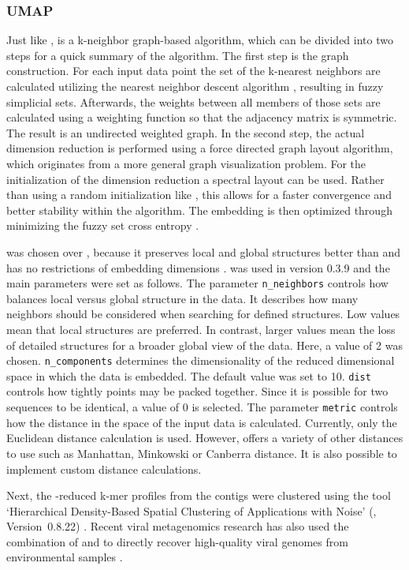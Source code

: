 \documentclass[12pt,a4paper,english]{article}
\begin{document}
	\subsubsection*{UMAP}
	Just like \tsne, \umap is a k-neighbor graph-based algorithm, which can be divided into two steps for a quick summary of the algorithm. The first step is the graph construction.
	For each input data point the set of the k-nearest neighbors are calculated utilizing the nearest neighbor descent algorithm \citep{k-near:11}, resulting in fuzzy simplicial sets.
	Afterwards, the weights between all members of those sets are calculated using a weighting function so that the adjacency matrix is symmetric. The result is an undirected weighted graph.
	In the second step, the actual dimension reduction is performed using a force directed graph layout algorithm, which originates from a more general graph visualization problem. For the initialization of the dimension reduction a spectral layout can be used. Rather than using a random initialization like \tsne, this allows for a faster convergence and better stability within the algorithm.
	The embedding is then optimized through minimizing the fuzzy set cross entropy \citep{umap:18}.
		  
	\umap was chosen over \tsne, because it preserves local and global structures better than \tsne and has no restrictions of embedding dimensions \citep{umap_better:19, umap:18}.	
	\umap was used in version 0.3.9 and the main parameters were set as follows.
	The parameter \texttt{n\_neighbors} controls how \umap balances local versus global structure in the data. It describes how many neighbors should be considered when searching for defined structures. Low values mean that local structures are preferred. In contrast, larger values mean the loss of detailed structures for a broader global view of the data. Here, a value of 2 was chosen.
	\texttt{n\_components} determines the dimensionality of the reduced dimensional space in which the data is embedded. The default value was set to 10.
	\texttt{dist} controls how tightly points may be packed together. Since it is possible for two sequences to be identical, a value of 0 is selected.
	The parameter \texttt{metric} controls how the distance in the space of the input data is calculated. Currently, only the Euclidean distance calculation is used. However, \umap offers a variety of other distances to use such as Manhattan, Minkowski or Canberra distance. It is also possible to implement custom distance calculations.

	Next, the \umap-reduced k-mer profiles from the contigs were clustered using the tool `Hierarchical Density-Based Spatial Clustering of Applications with Noise' (\hdbscan, Version~0.8.22) \citep{hdbscan}.
	Recent viral metagenomics research has also used the combination of \umap and \hdbscan to directly recover high-quality viral genomes from environmental samples \citep{umap_hdbscan_usage:19}.
\end{document}
